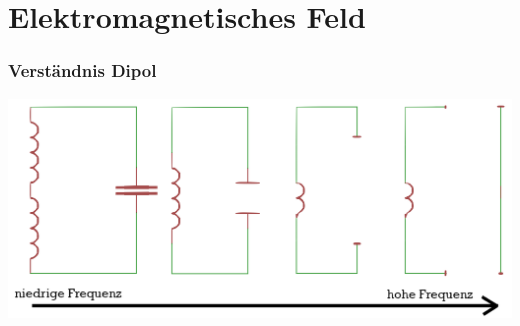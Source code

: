\section*{Elektromagnetisches Feld}
\begin{frame}
    \frametitle{Verständnis Dipol}
    \begin{center}
		\includegraphics[width=1\textwidth]{a08/dipol_entstehung.png}\\
	\end{center}
\end{frame}

